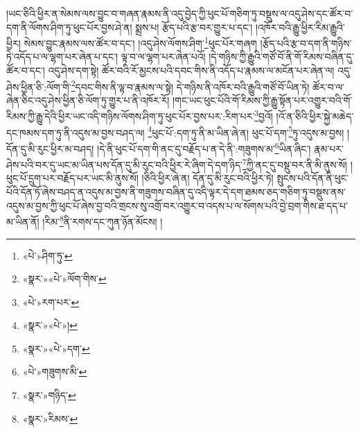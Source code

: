 །ཡང་ཅིའི་ཕྱིར་ན་སེམས་ལས་བྱུང་བ་གཞན་རྣམས་ནི་འདུ་བྱེད་ཀྱི་ཕུང་པོ་གཅིག་ཏུ་བསྡུས་ལ་འདུ་ཤེས་དང་ཚོར་བ་དག་ནི་ལོགས་ཤིག་ཏུ་ཕུང་པོར་བྱས་ཤེ་ན། སྨྲས་པ། རྩོད་པའི་རྩ་བར་གྱུར་པ་དང་། །འཁོར་བའི་རྒྱུ་ཕྱིར་རིམ་རྒྱུའི་ཕྱིར། སེམས་བྱུང་རྣམས་ལས་ཚོར་བ་དང་། །འདུ་ཤེས་ལོགས་ཤིག་\footnote{«པེ་»ཤིག་ཏུ་}ཕུང་པོར་གཞག །རྩོད་པའི་རྩ་བ་དག་ནི་གཉིས་ཏེ་འདོད་པ་ལ་ལྷག་པར་ཞེན་པ་དང་། ལྟ་བ་ལ་ལྷག་པར་ཞེན་པའོ། །དེ་གཉིས་ཀྱི་རྒྱུའི་གཙོ་བོ་ནི་གོ་རིམས་བཞིན་དུ་ཚོར་བ་དང་། འདུ་ཤེས་དག་སྟེ། ཚོར་བའི་རོ་མྱངས་པའི་དབང་གིས་ནི་འདོད་པ་རྣམས་ལ་མངོན་པར་ཞེན་ལ། འདུ་ཤེས་ཕྱིན་ཅི་:ལོག་གི་\footnote{«སྣར་»«པེ་»ལོག་གིས་}དབང་གིས་ནི་ལྟ་བ་རྣམས་ལ་སྟེ། དེ་གཉིས་ནི་འཁོར་བའི་རྒྱུའི་གཙོ་བོ་ཡིན་ཏེ། ཚོར་བ་ལ་ཞེན་ཅིང་འདུ་ཤེས་ཕྱིན་ཅི་ལོག་ཏུ་གྱུར་པ་ནི་འཁོར་རོ། །གང་ཡང་ཕུང་པོའི་གོ་རིམས་ཀྱི་རྒྱུ་སྟོན་པར་འགྱུར་བའི་གོ་རིམས་ཀྱི་རྒྱུ་དེའི་ཕྱིར་ཡང་འདི་གཉིས་ལོགས་ཤིག་ཏུ་ཕུང་པོར་བྱས་པར་:རིག་པར་\footnote{«པེ་»རག་པར་}བྱའོ། །འོ་ན་ཅིའི་ཕྱིར་སྐྱེ་མཆེད་དང་ཁམས་དག་ཏུ་ནི་འདུས་མ་བྱས་བཤད་ལ། \footnote{«སྣར་»«པེ་»།  }ཕུང་པོ་:དག་ཏུ་ནི་མ་ཡིན་ཞེ་ན། ཕུང་པོ་དག་\footnote{«སྣར་»«པེ་»དག་}ཏུ་འདུས་མ་བྱས། །དོན་དུ་མི་རུང་ཕྱིར་མ་བཤད། །དེ་ནི་ཕུང་པོ་དག་གི་ནང་དུ་བརྗོད་པ་ན་དེ་ནི་:གཟུགས་མ་\footnote{«པེ་»གཟུགས་མི་}ཡིན་ཞིང་། རྣམ་པར་ཤེས་པའི་བར་དུ་ཡང་མ་ཡིན་པས་དོན་དུ་མི་རུང་བའི་ཕྱིར་རེ་ཞིག་དེ་དག་ཉིད་\footnote{«སྣར་»གཉིད་}ཀྱི་ནང་དུ་བསྡུ་བར་ནི་མི་ནུས་སོ། །ཕུང་པོ་དྲུག་པར་བརྗོད་པར་ཡང་མི་ནུས་སོ། །ཅིའི་ཕྱིར་ཞེ་ན། དོན་དུ་མི་རུང་བའི་ཕྱིར་ཏེ། སྤུངས་པའི་དོན་ནི་ཕུང་པོའི་དོན་ཏོ་ཞེས་བཤད་ན་འདུས་མ་བྱས་ནི་གཟུགས་བཞིན་དུ་འདི་ལྟར་དེ་དག་ཐམས་ཅད་གཅིག་ཏུ་བསྡུས་ནས་འདུས་མ་བྱས་ཀྱི་ཕུང་པོ་ཞེས་བྱ་བའི་གྲངས་སུ་འགྲོ་བར་འགྱུར་བ་འདས་པ་ལ་སོགས་པའི་བྱེ་བྲག་གིས་ཐ་དད་པ་མ་ཡིན་ནོ། །རིམ་\footnote{«སྣར་»རིམས་}ནི་རགས་དང་ཀུན་ཉོན་མོངས། །
